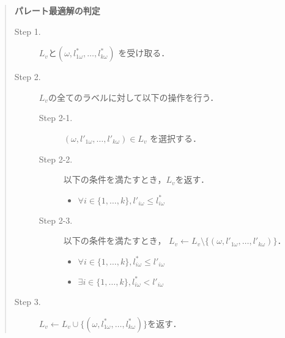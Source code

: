 \documentclass[12pt]{optlab-bachelor}
\begin{document}
\begin{quote}
  \textbf{パレート最適解の判定}
  \begin{description}
    \item[Step 1.] $L_v$と$(\omega,l^*_{1\omega},\ldots,l^*_{k\omega})$
    を受け取る．
    \item[Step 2.] $L_v$の全てのラベルに対して以下の操作を行う．
    \begin{description}
    \item[Step 2-1.] $(\omega,l'_{1\omega},\ldots,l'_{k\omega}) \in L_v$
    を選択する．
    \item[Step 2-2.] 以下の条件を満たすとき，$L_v$を返す．
    \begin{itemize}
      \item $\forall i \in \{1,\ldots,k\},l'_{i\omega} \le l^*_{i\omega}$
    \end{itemize}
    \item[Step 2-3.] 以下の条件を満たすとき，
    $L_v \leftarrow L_v \setminus \{(\omega,l'_{1\omega},\ldots,l'_{k\omega})\}$．
    \begin{itemize}
      \item $\forall i \in \{1,\ldots,k\},l^*_{i\omega} \le l'_{i\omega}$
      \item $\exists i \in \{1,\ldots,k\},l^*_{i\omega} < l'_{i\omega}$
    \end{itemize}
    \end{description}
    \item[Step 3.]
    $L_v \leftarrow L_v \cup \{(\omega,l^*_{1\omega},\ldots,l^*_{k\omega})\}$を返す．
  \end{description}
\end{quote}
\end{document}
